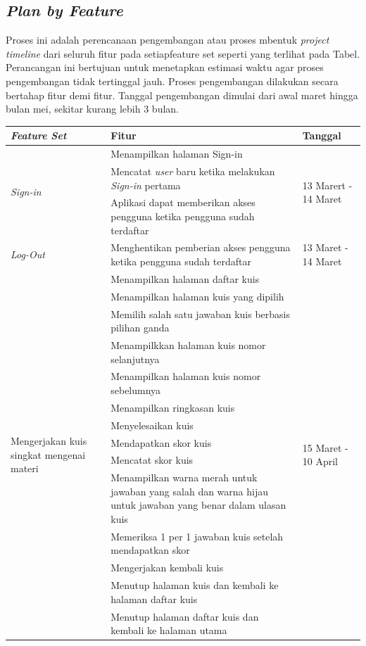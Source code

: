 \subsection{\textit{Plan by Feature}}
Proses ini adalah perencanaan pengembangan atau proses mbentuk \textit{project timeline} dari seluruh fitur pada setiapfeature set seperti yang terlihat pada Tabel.
Perancangan ini bertujuan untuk menetapkan estimasi waktu agar proses pengembangan tidak tertinggal jauh.
Proses pengembangan dilakukan secara bertahap fitur demi fitur. Tanggal pengembangan dimulai dari awal maret hingga bulan mei, sekitar kurang lebih 3 bulan.

\begin{table}[H]
	\begin{tabular}{|p{3cm}|p{}|p{2cm}|}
		\hline
		\centering\textbf{\textit{Feature Set}} & \centering\textbf{Fitur} & \multicolumn{1}{m{2cm}|}{\centering \textbf{Tanggal}} \\
		\hline
		\multirow{3}{2.5cm}{\textit{Sign-in}} &Menampilkan halaman Sign-in & \multirow{3}{2cm}{13 Marert - 14 Maret} \\
		\cline{2-2}
		 &Mencatat \textit{user} baru ketika melakukan \textit{Sign-in} pertama & \\
		\cline{2-2}
		 &Aplikasi dapat memberikan akses pengguna ketika pengguna sudah terdaftar&  \\
		\hline
		\multirow{1}{2.5cm}{\textit{Log-Out}} &Menghentikan pemberian akses pengguna ketika pengguna sudah terdaftar& 13 Maret - 14 Maret \\
		\hline
		\multirow{14}{2.5cm}{Mengerjakan kuis singkat mengenai materi} &Menampilkan halaman daftar kuis& \multirow{14}{2cm}{15 Maret - 10 April}\\
		\cline{2-2}
		&Menampilkan halaman kuis yang dipilih& \\
		\cline{2-2}
		&Memilih salah satu jawaban kuis berbasis pilihan ganda&  \\
		\cline{2-2}
		&Menampilkkan halaman kuis nomor selanjutnya&  \\
		\cline{2-2}
		&Menampilkan halaman kuis nomor sebelumnya& \\
		\cline{2-2}
		&Menampilkan ringkasan kuis& \\
		\cline{2-2}
		&Menyelesaikan kuis&\\
		\cline{2-2}
		&Mendapatkan skor kuis&  \\
		\cline{2-2}
		&Mencatat skor kuis&  \\
		\cline{2-2}
		&Menampilkan warna merah untuk jawaban yang salah dan warna hijau untuk jawaban yang benar dalam ulasan kuis& \\
		\cline{2-2}
		&Memeriksa 1 per 1 jawaban kuis setelah mendapatkan skor&  \\
		\cline{2-2}
		&Mengerjakan kembali kuis& \\
		\cline{2-2}
		&Menutup halaman kuis dan kembali ke halaman daftar kuis&  \\
		\cline{2-2}
		&Menutup halaman daftar kuis dan kembali ke halaman utama& \\
		\hline
		
	\end{tabular}
\end{table}
